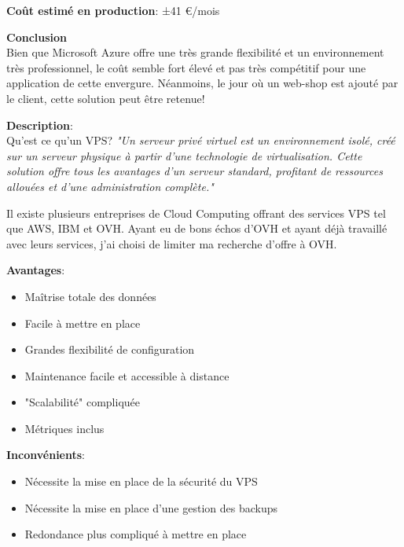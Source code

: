 \newpara
\textbf{Coût estimé en production}: ±41 €/mois

\newpara
\textbf{Conclusion} \\ Bien que Microsoft Azure offre une très grande flexibilité et un environnement très professionnel, le coût semble fort élevé et pas très compétitif pour une application de cette envergure. Néanmoins, le jour où un web-shop est ajouté par le client, cette solution peut être retenue!

\newpage
{}

\textbf{Description}: \\ Qu'est ce qu'un VPS? \textit{"Un serveur privé virtuel est un environnement isolé, créé sur un serveur physique à partir d’une technologie de virtualisation. Cette solution offre tous les avantages d’un serveur standard, profitant de ressources allouées et d’une administration complète."}\cite{VPS}

\newpara
Il existe plusieurs entreprises de Cloud Computing offrant des services VPS tel que AWS, IBM et OVH. Ayant eu de bons échos d'OVH et ayant déjà travaillé avec leurs services, j'ai choisi de limiter ma recherche d'offre à OVH.

\newpara
\textbf{Avantages}:
\begin{itemize}
  \item Maîtrise totale des données
  \item Facile à mettre en place
  \item Grandes flexibilité de configuration
  \item Maintenance facile et accessible à distance
  \item "Scalabilité" compliquée 
  \item Métriques inclus
\end{itemize}
  
\newpara
\textbf{Inconvénients}:
\begin{itemize}
  \item Nécessite la mise en place de la sécurité du VPS
  \item Nécessite la mise en place d'une gestion des backups
  \item Redondance plus compliqué à mettre en place
\end{itemize}

